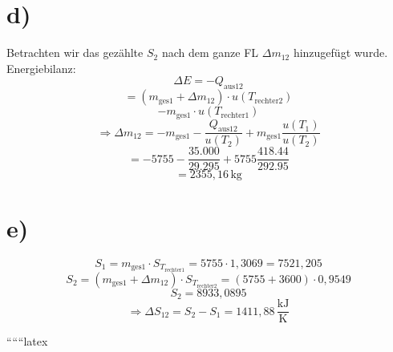 \section*{d)}
Betrachten wir das gezählte $S_2$ nach dem ganze FL $\Delta m_{12}$ hinzugefügt wurde. Energiebilanz:
\[
\Delta E = -Q_{\text{aus}12}
\]
\[
= (m_{\text{ges}1} + \Delta m_{12}) \cdot u(T_{\text{rechter}2})
\]
\[
- m_{\text{ges}1} \cdot u(T_{\text{rechter}1})
\]
\[
\Rightarrow \Delta m_{12} = -m_{\text{ges}1} - \frac{Q_{\text{aus}12}}{u(T_2)} + m_{\text{ges}1} \frac{u(T_1)}{u(T_2)}
\]
\[
= -5755 - \frac{35.000}{29.295} + 5755 \frac{418.44}{292.95}
\]
\[
= 2355{,}16 \, \text{kg}
\]

\section*{e)}
\[
S_1 = m_{\text{ges}1} \cdot S_{T_{\text{rechter}1}} = 5755 \cdot 1{,}3069 = 7521{,}205
\]
\[
S_2 = (m_{\text{ges}1} + \Delta m_{12}) \cdot S_{T_{\text{rechter}2}} = (5755 + 3600) \cdot 0{,}9549
\]
\[
S_2 = 8933{,}0895
\]
\[
\Rightarrow \Delta S_{12} = S_2 - S_1 = 1411{,}88 \, \frac{\text{kJ}}{\text{K}}
\]

``````latex


